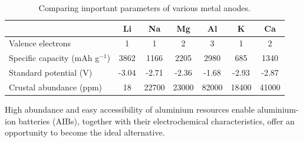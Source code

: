 \begin{table}[tbh!]
\centering
\caption{Comparing important parameters of various metal anodes.} \label{table2}
\begin{tabular}{|p{3.5cm}cccccc|}
\hline
 & \textbf{Li} & \textbf{Na} & \textbf{Mg} & \textbf{Al} & \textbf{K} & \textbf{Ca}\\
\hline
Valence electrons & 1 & 1 & 2 & 3 & 1 & 2\\
Specific capacity (mAh g$^{-1}$) & 3862 & 1166 & 2205 & 2980 & 685 & 1340\\
Standard potential (V) & -3.04 & -2.71 & -2.36  & -1.68 & -2.93 & -2.87\\
Crustal abundance (ppm) & 18 & 22700 & 23000 & 82000 & 18400 & 41000\\
\hline  %
\end{tabular}
\end{table}

High abundance and easy accessibility of aluminium resources enable aluminium-ion batteries (AIBs), together with their electrochemical characteristics, offer an opportunity to become the ideal alternative.

